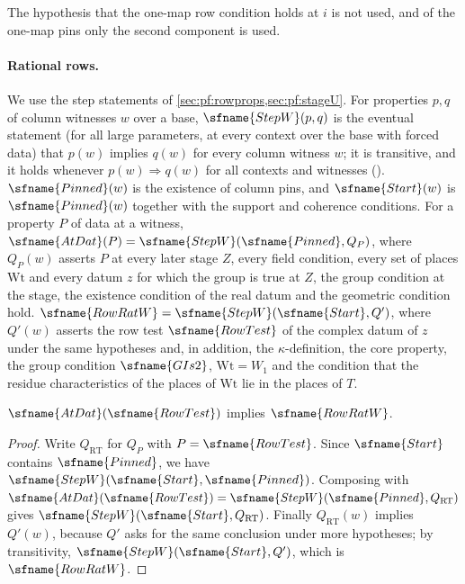 \begin{remark}\label{pf:sh-div:rem:classsum}
The hypothesis that the one-map row condition holds at $i$ is not used, and of the one-map pins only the second component is used.
\end{remark}

\paragraph{Rational rows.} We use the step statements of \cref{sec:pf:rowprops,sec:pf:stageU}. For properties $p,q$ of column
witnesses $w$ over a base, $\sfname{StepW}(p,q)$ is the eventual statement (for all large parameters, at every context over the base
with forced data) that $p(w)$ implies $q(w)$ for every column witness $w$; it is transitive, and it holds whenever $p(w)\Rightarrow q(w)$
for all contexts and witnesses (). $\sfname{Pinned}(w)$ is the existence of column pins,
and $\sfname{Start}(w)$ is $\sfname{Pinned}(w)$ together with the support and coherence conditions. For a property $P$ of data at a
witness, $\sfname{AtDat}(P)=\sfname{StepW}(\sfname{Pinned},Q_P)$, where $Q_P(w)$ asserts $P$ at every later stage $Z$, every field
condition, every set of places $\mathrm{Wt}$ and every datum $z$ for which the group is true at $Z$, the group condition at the stage,
the existence condition of the real datum and the geometric condition hold. $\sfname{RowRatW}=\sfname{StepW}(\sfname{Start},Q')$, where
$Q'(w)$ asserts the row test $\sfname{RowTest}$ of the complex datum of $z$ under the same hypotheses and, in addition, the
$\kappa$-definition, the core property, the group condition $\sfname{GIs2}$, $\mathrm{Wt}=W_1$ and the condition that the residue
characteristics of the places of $\mathrm{Wt}$ lie in the places of $T$.

\begin{proposition}\label{pf:sh-div:rowrat}
$\sfname{AtDat}(\sfname{RowTest})$ implies $\sfname{RowRatW}$.
\end{proposition}

\begin{proof}
Write $Q_{\mathrm{RT}}$ for $Q_P$ with $P=\sfname{RowTest}$. Since $\sfname{Start}$ contains $\sfname{Pinned}$, we have
$\sfname{StepW}(\sfname{Start},\sfname{Pinned})$. Composing with $\sfname{AtDat}(\sfname{RowTest})=\sfname{StepW}(\sfname{Pinned},Q_{\mathrm{RT}})$
gives $\sfname{StepW}(\sfname{Start},Q_{\mathrm{RT}})$. Finally $Q_{\mathrm{RT}}(w)$ implies $Q'(w)$, because $Q'$ asks for the same
conclusion under more hypotheses; by transitivity, $\sfname{StepW}(\sfname{Start},Q')$, which is $\sfname{RowRatW}$.
\end{proof}

